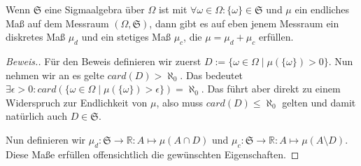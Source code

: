 \begin{lemma}
    Wenn $\mathfrak{S}$ eine Sigmaalgebra über $\Omega$ ist mit $\forall\omega\in\Omega:\{\omega\}\in\mathfrak{S}$ und $\mu$ ein endliches Maß auf dem Messraum $(\Omega,\mathfrak{S})$, dann gibt es auf eben jenem Messraum ein diskretes Maß $\mu_d$ und ein stetiges Maß $\mu_c$, die $\mu=\mu_d+\mu_c$ erfüllen.
\end{lemma}
\begin{proof}[Beweis.]
    Für den Beweis definieren wir zuerst $D:=\{\omega\in\Omega\mid\mu(\{\omega\})>0\}$. Nun nehmen wir an es gelte $card(D)>\aleph_0$. Das bedeutet $\exists\epsilon>0:card(\{\omega\in\Omega\mid\mu(\{\omega\})>\epsilon\})=\aleph_0$. Das führt aber direkt zu einem Widerspruch zur Endlichkeit von $\mu$, also muss $card(D)\leq\aleph_0$ gelten und damit natürlich auch $D\in\mathfrak{S}$.

    Nun definieren wir $\mu_d:\mathfrak{S}\rightarrow\mathbb{R}:A\mapsto\mu(A\cap D)$ und $\mu_c:\mathfrak{S}\rightarrow\mathbb{R}:A\mapsto\mu(A\setminus D)$. Diese Maße erfüllen offensichtlich die gewünschten Eigenschaften.
\end{proof}